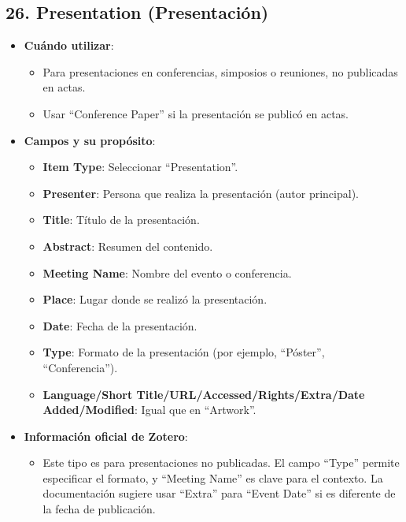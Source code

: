 \documentclass[
  jou,
  floatsintext,
  longtable,
  a4paper,
  nolmodern,
  notxfonts,
  notimes,
  colorlinks=true,linkcolor=blue,citecolor=blue,urlcolor=blue]{apa7}
\providecommand{\tightlist}{%
  \setlength{\itemsep}{0pt}\setlength{\parskip}{0pt}}
\begin{document}
\subsection{26. Presentation
(Presentación)}\label{presentation-presentaciuxf3n}

\begin{itemize}
\tightlist
\item
  \textbf{Cuándo utilizar}:

  \begin{itemize}
  \tightlist
  \item
    Para presentaciones en conferencias, simposios o reuniones, no
    publicadas en actas.
  \item
    Usar ``Conference Paper'' si la presentación se publicó en actas.
  \end{itemize}
\item
  \textbf{Campos y su propósito}:

  \begin{itemize}
  \tightlist
  \item
    \textbf{Item Type}: Seleccionar ``Presentation''.
  \item
    \textbf{Presenter}: Persona que realiza la presentación (autor
    principal).
  \item
    \textbf{Title}: Título de la presentación.
  \item
    \textbf{Abstract}: Resumen del contenido.
  \item
    \textbf{Meeting Name}: Nombre del evento o conferencia.
  \item
    \textbf{Place}: Lugar donde se realizó la presentación.
  \item
    \textbf{Date}: Fecha de la presentación.
  \item
    \textbf{Type}: Formato de la presentación (por ejemplo, ``Póster'',
    ``Conferencia'').
  \item
    \textbf{Language/Short Title/URL/Accessed/Rights/Extra/Date
    Added/Modified}: Igual que en ``Artwork''.
  \end{itemize}
\item
  \textbf{Información oficial de Zotero}:

  \begin{itemize}
  \tightlist
  \item
    Este tipo es para presentaciones no publicadas. El campo ``Type''
    permite especificar el formato, y ``Meeting Name'' es clave para el
    contexto. La documentación sugiere usar ``Extra'' para ``Event
    Date'' si es diferente de la fecha de publicación.
  \end{itemize}
\end{itemize}
\end{document}
